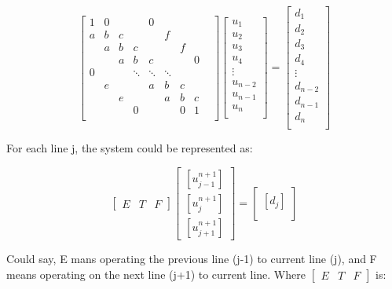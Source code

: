 \documentclass[12pt]{article}
\begin{document}
\[
\begin{bmatrix}
1 & 0 &   &   & 0 &   &    &\\
a & b & c &   &   & f &    &\\
  & a & b & c &   &   & f  &\\
  &   & a & b & c &   &    & 0\\
0 &   &   & \ddots & \ddots & \ddots &  &  \\
  & e &   &   & a & b & c &   &\\
  &   & e &   &   & a & b & c \\
  &   &   & 0 &   &   & 0 & 1 \\
\end{bmatrix}
\begin{bmatrix}
u_1 \\
u_2 \\
u_3 \\
u_4 \\
\vdots \\
u_{n-2} \\
u_{n-1} \\
u_n \\
\end{bmatrix}
=
\begin{bmatrix}
d_1 \\
d_2 \\
d_3 \\
d_4 \\
\vdots \\
d_{n-2} \\
d_{n-1} \\
d_n \\
\end{bmatrix}
\]




For each line j, the system could be represented as:

\[
\left[
\begin{array}{c|c|c}
E & T & F 
\end{array}
\right]
\begin{bmatrix}
    [u_{j-1}^{n+1}] \\
    [u_{j}^{n+1}] \\
   [ u_{j+1}^{n+1}]
\end{bmatrix}
=
\begin{bmatrix}
    [d_{j}] \\
\end{bmatrix}
\]

Could say, E mans operating the previous line (j-1) to current line (j), and F means operating on the next line (j+1) to current line. Where $\left[
\begin{array}{c|c|c}
E & T & F 
\end{array}
\right]$ is:
\end{document}
